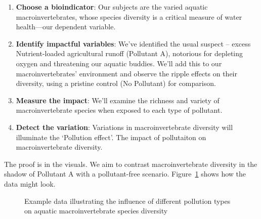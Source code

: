 \documentclass[
  letterpaper,
  DIV=11,
  numbers=noendperiod]{scrreprt}
\begin{document}
\begin{enumerate}
\def\labelenumi{\arabic{enumi}.}
\item
  \textbf{Choose a bioindicator}: Our subjects are the varied aquatic
  macroinvertebrates, whose species diversity is a critical measure of
  water health---our dependent variable.
\item
  \textbf{Identify impactful variables}: We've identified the usual
  suspect -- excess Nutrient-loaded agricultural runoff (Pollutant A),
  notorious for depleting oxygen and threatening our aquatic buddies.
  We'll add this to our macroinvertebrates' environment and observe the
  ripple effects on their diversity, using a pristine control (No
  Pollutant) for comparison.
\item
  \textbf{Measure the impact}: We'll examine the richness and variety of
  macroinvertebrate species when exposed to each type of pollutant.
\item
  \textbf{Detect the variation}: Variations in macroinvertebrate
  diversity will illuminate the `Pollution effect'. The impact of
  pollutaiton on macroinvertebrate diversity.
\end{enumerate}

The proof is in the visuals. We aim to contrast macroinvertebrate
diversity in the shadow of Pollutant A with a pollutant-free scenario.
Figure~\ref{fig-10biodiversityeffect} shows how the data might look.

\begin{figure}


\caption{\label{fig-10biodiversityeffect}Example data illustrating the
influence of different pollution types on aquatic macroinvertebrate
species diversity}

\end{figure}%
\end{document}
